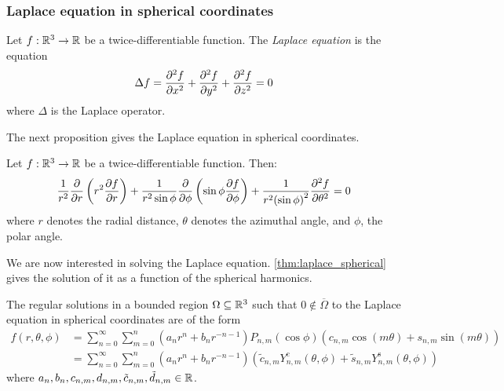 \documentclass[../main.tex]{subfiles}
\begin{document}
\subsubsection{Laplace equation in spherical coordinates}\label{sec:laplace_spherical}
\begin{definition}
  Let $f:\mathbb{R}^3\rightarrow\mathbb{R}$ be a twice-differentiable function. The \emph{Laplace equation} is the equation
  \begin{equation}
    \Delta f=\pdv[2]{f}{x}+\pdv[2]{f}{y}+\pdv[2]{f}{z}=0
  \end{equation}
  where $\Delta$ is the Laplace operator.
\end{definition}
The next proposition gives the Laplace equation in spherical coordinates.
\begin{proposition}
  Let $f:\mathbb{R}^3\rightarrow\mathbb{R}$ be a twice-differentiable function. Then:
  \begin{equation}\label{eq:laplace}
    \frac{1}{r^2}\pdv{}{r}\left(r^2\pdv{f}{r}\right)+\frac{1}{r^2\sin\phi}\pdv{}{\phi}\left(\sin\phi\pdv{f}{\phi}\right)+\frac{1}{r^2{(\sin\phi)}^2}\pdv[2]{f}{\theta}=0
  \end{equation}
  where $r$ denotes the radial distance, $\theta$ denotes the azimuthal angle, and $\phi$, the polar angle.
\end{proposition}
We are now interested in solving the Laplace equation. \cref{thm:laplace_spherical} gives the solution of it as a function of the spherical harmonics.
\begin{theorem}\label{thm:laplace_spherical}
  The regular solutions in a bounded region $\Omega\subseteq \mathbb{R}^3$ such that $0\notin\overline{\Omega}$ to the Laplace equation in spherical coordinates are of the form
  \begin{align}
    f(r,\theta,\phi) & = \sum_{n=0}^\infty \sum_{m=0}^n (a_n r^{n} +b_{n}r^{-n-1})P_{n,m}(\cos\phi) (c_{n,m}\cos(m\theta)+s_{n,m}\sin(m\theta))                                                              \\
                     & \label{eq:sol_laplace} = \sum_{n=0}^\infty \sum_{m=0}^n (a_n r^{n} +b_{n}r^{-n-1})(\tilde{c}_{n,m}Y_{n,m}^{\mathrm{c}}(\theta,\phi)+\tilde{s}_{n,m}Y_{n,m}^{\mathrm{s}}(\theta,\phi))
  \end{align}
  where $a_n,b_n,c_{n,m},d_{n,m},\tilde{c}_{n,m},\tilde{d}_{n,m}\in\mathbb{R}$.
\end{theorem}
\end{document}
